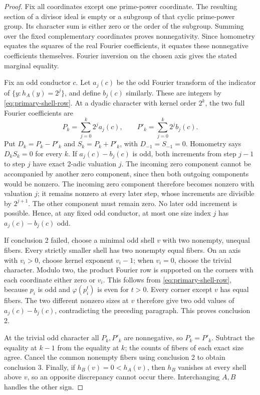 \documentclass[11pt]{article}
\numberwithin{equation}{section}
\theoremstyle{definition}
\theoremstyle{remark}
\begin{document}
\begin{proof}
Fix all coordinates except one prime-power coordinate. The resulting
section of a divisor ideal is empty or a subgroup of that cyclic
prime-power group. Its character sum is either zero or the order of the
subgroup. Summing over the fixed complementary coordinates proves
nonnegativity. Since homometry equates the squares of the real Fourier
coefficients, it equates these nonnegative coefficients themselves.
Fourier inversion on the chosen axis gives the stated marginal equality.

Fix an odd conductor \(c\). Let \(a_j(c)\) be the odd Fourier transform
of the indicator of \(\{y:h_A(y)=2^j\}\), and define \(b_j(c)\)
similarly. These are integers by \eqref{eq:primary-shell-row}. At a
dyadic character with kernel order \(2^k\), the two full Fourier
coefficients are
\[
P_k=\sum_{j=0}^k2^ja_j(c),\qquad
P'_k=\sum_{j=0}^k2^jb_j(c).
\]
Put \(D_k=P_k-P'_k\) and \(S_k=P_k+P'_k\), with
\(D_{-1}=S_{-1}=0\). Homometry says \(D_kS_k=0\) for every \(k\).
If \(a_j(c)-b_j(c)\) is odd, both increments from step \(j-1\) to
step \(j\) have exact 2-adic valuation \(j\). The incoming zero
component cannot be accompanied by another zero component, since then
both outgoing components would be nonzero. The incoming zero component
therefore becomes nonzero with valuation \(j\); it remains nonzero at
every later step, whose increments are divisible by \(2^{j+1}\).
The other component must remain zero. No later odd increment is
possible. Hence, at any fixed odd conductor, at most one size index
\(j\) has \(a_j(c)-b_j(c)\) odd.

If conclusion 2 failed, choose a minimal odd shell \(v\) with two
nonempty, unequal fibers. Every strictly smaller shell has two
nonempty equal fibers. On an axis with \(v_i>0\), choose kernel
exponent \(v_i-1\); when \(v_i=0\), choose the trivial character.
Modulo two, the product Fourier row is supported on the corners with
each coordinate either zero or \(v_i\). This follows from
\eqref{eq:primary-shell-row}, because \(p_i\) is odd and
\(\varphi(p_i^t)\) is even for \(t>0\). Every corner except \(v\)
has equal fibers. The two different nonzero sizes at \(v\) therefore
give two odd values of \(a_j(c)-b_j(c)\), contradicting the preceding
paragraph. This proves conclusion 2.

At the trivial odd character all \(P_k,P'_k\) are nonnegative, so
\(P_k=P'_k\). Subtract the equality at \(k-1\) from the equality
at \(k\); the counts of fibers of each exact size agree. Cancel the
common nonempty fibers using conclusion 2 to obtain conclusion 3.
Finally, if \(h_B(v)=0<h_A(v)\), then \(h_B\) vanishes at every
shell above \(v\), so an opposite discrepancy cannot occur there.
Interchanging \(A,B\) handles the other sign.
\end{proof}
\end{document}
